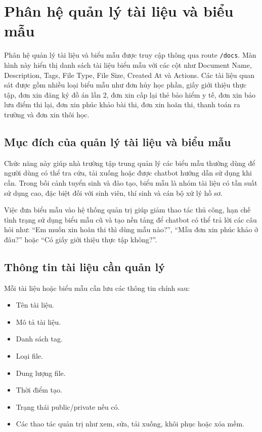 \section{Phân hệ quản lý tài liệu và biểu mẫu}

Phân hệ quản lý tài liệu và biểu mẫu được truy cập thông qua route \texttt{/docs}. Màn hình này hiển thị danh sách tài liệu biểu mẫu với các cột như Document Name, Description, Tags, File Type, File Size, Created At và Actions. Các tài liệu quan sát được gồm nhiều loại biểu mẫu như đơn hủy học phần, giấy giới thiệu thực tập, đơn xin đăng ký đồ án lần 2, đơn xin cấp lại thẻ bảo hiểm y tế, đơn xin bảo lưu điểm thi lại, đơn xin phúc khảo bài thi, đơn xin hoãn thi, thanh toán ra trường và đơn xin thôi học.

\subsection{Mục đích của quản lý tài liệu và biểu mẫu}

Chức năng này giúp nhà trường tập trung quản lý các biểu mẫu thường dùng để người dùng có thể tra cứu, tải xuống hoặc được chatbot hướng dẫn sử dụng khi cần. Trong bối cảnh tuyển sinh và đào tạo, biểu mẫu là nhóm tài liệu có tần suất sử dụng cao, đặc biệt đối với sinh viên, thí sinh và cán bộ xử lý hồ sơ.

Việc đưa biểu mẫu vào hệ thống quản trị giúp giảm thao tác thủ công, hạn chế tình trạng sử dụng biểu mẫu cũ và tạo nền tảng để chatbot có thể trả lời các câu hỏi như: ``Em muốn xin hoãn thi thì dùng mẫu nào?'', ``Mẫu đơn xin phúc khảo ở đâu?'' hoặc ``Có giấy giới thiệu thực tập không?''.

\subsection{Thông tin tài liệu cần quản lý}

Mỗi tài liệu hoặc biểu mẫu cần lưu các thông tin chính sau:

\begin{itemize}
    \item Tên tài liệu.
    \item Mô tả tài liệu.
    \item Danh sách tag.
    \item Loại file.
    \item Dung lượng file.
    \item Thời điểm tạo.
    \item Trạng thái public/private nếu có.
    \item Các thao tác quản trị như xem, sửa, tải xuống, khôi phục hoặc xóa mềm.
\end{itemize}

